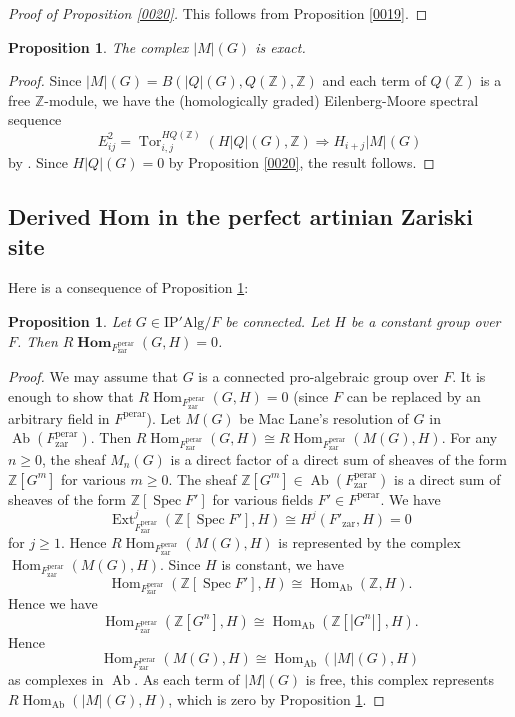 \documentclass{amsart}
\newtheorem{Prop}[Thm]{Proposition}
\theoremstyle{remark}
\numberwithin{equation}{subsection}
\newcommand{\Z}{\mathbb{Z}}
\newcommand{\zar}{\mathrm{zar}}
\newcommand{\perar}{\mathrm{perar}}
\newcommand{\Alg}{\mathrm{Alg}}
\newcommand{\Ind}{\mathrm{I}}
\newcommand{\Pro}{\mathrm{P}}
\newcommand{\alg}[1]{\mathbf{#1}}
\DeclareMathOperator{\Hom}{Hom}
\DeclareMathOperator{\Ext}{Ext}
\DeclareMathOperator{\Tor}{Tor}
\DeclareMathOperator{\Spec}{Spec}
\DeclareMathOperator{\Ab}{Ab}
\DeclareMathOperator{\sheafhom}{\alg{Hom}}
\begin{document}
\begin{proof}[Proof of Proposition \ref{0020}]
	This follows from Proposition \ref{0019}.
\end{proof}

\begin{Prop} \label{0021}
	The complex $|M|(G)$ is exact.
\end{Prop}

\begin{proof}
	Since $|M|(G) = B(|Q|(G), Q(\Z), \Z)$ and each term of $Q(\Z)$ is a free $\Z$-module,
	we have the (homologically graded) Eilenberg-Moore spectral sequence
		\[
				E_{i j}^{2}
			=
				\Tor_{i, j}^{HQ(\Z)}(H|Q|(G), \Z)
			\Longrightarrow
				H_{i + j} |M|(G)
		\]
	by \cite[Proposition 10.19 and the paragraph thereafter]{BMR14}.
	Since $H|Q|(G) = 0$ by Proposition \ref{0020},
	the result follows.
\end{proof}


\subsection{Derived Hom in the perfect artinian Zariski site}
\label{0157}

Here is a consequence of Proposition \ref{0021}:

\begin{Prop} \label{0022}
	Let $G \in \Ind \Pro' \Alg / F$ be connected.
	Let $H$ be a constant group over $F$.
	Then $R \sheafhom_{F^{\perar}_{\zar}}(G, H) = 0$.
\end{Prop}

\begin{proof}
	We may assume that $G$ is a connected pro-algebraic group over $F$.
	It is enough to show that
	$R \Hom_{F^{\perar}_{\zar}}(G, H) = 0$
	(since $F$ can be replaced by an arbitrary field in $F^{\perar}$).
	Let $M(G)$ be Mac Lane's resolution of $G$ in $\Ab(F^{\perar}_{\zar})$.
	Then $R \Hom_{F^{\perar}_{\zar}}(G, H) \cong R \Hom_{F^{\perar}_{\zar}}(M(G), H)$.
	For any $n \ge 0$, the sheaf $M_{n}(G)$ is a direct factor
	of a direct sum of sheaves of the form $\Z[G^{m}]$ for various $m \ge 0$.
	The sheaf $\Z[G^{m}] \in \Ab(F^{\perar}_{\zar})$ is a direct sum of
	sheaves of the form $\Z[\Spec F']$ for various fields $F' \in F^{\perar}$.
	We have
		\[
				\Ext_{F^{\perar}_{\zar}}^{j}(\Z[\Spec F'], H)
			\cong
				H^{j}(F'_{\zar}, H)
			=
				0
		\]
	for $j \ge 1$.
	Hence $R \Hom_{F^{\perar}_{\zar}}(M(G), H)$ is represented by
	the complex $\Hom_{F^{\perar}_{\zar}}(M(G), H)$.
	Since $H$ is constant, we have
		\[
				\Hom_{F^{\perar}_{\zar}}(\Z[\Spec F'], H)
			\cong
				\Hom_{\Ab}(\Z, H).
		\]
	Hence we have
		\[
				\Hom_{F^{\perar}_{\zar}}(\Z[G^{n}], H)
			\cong
				\Hom_{\Ab}(\Z[|G^{n}|], H).
		\]
	Hence
		\[
				\Hom_{F^{\perar}_{\zar}}(M(G), H)
			\cong
				\Hom_{\Ab}(|M|(G), H)
		\]
	as complexes in $\Ab$.
	As each term of $|M|(G)$ is free, this complex represents
	$R \Hom_{\Ab}(|M|(G), H)$,
	which is zero by Proposition \ref{0021}.
\end{proof}
\end{document}
